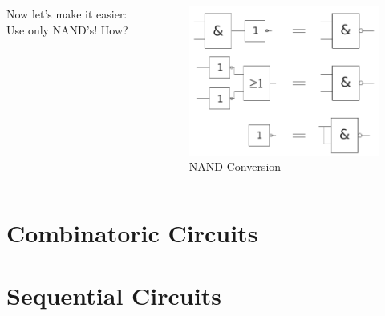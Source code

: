 \documentclass{beamer}
\begin{document}
\begin{frame}
  \begin{columns}
  \begin{column}{5cm}
  Now let's make it easier: Use only NAND's!
  How?
  \newline\newline
  \end{column}
  
  \begin{column}{6cm}
    \begin{figure}[H]
      \centering
      \includegraphics[width=1\textwidth]{nand_conversion}%
      \caption{NAND Conversion}%
      \label{fig:equivalence_optimized}
    \end{figure}
  \end{column}
  \end{columns}  
\end{frame}





\section{Combinatoric Circuits}
\section{Sequential Circuits}
\end{document}
